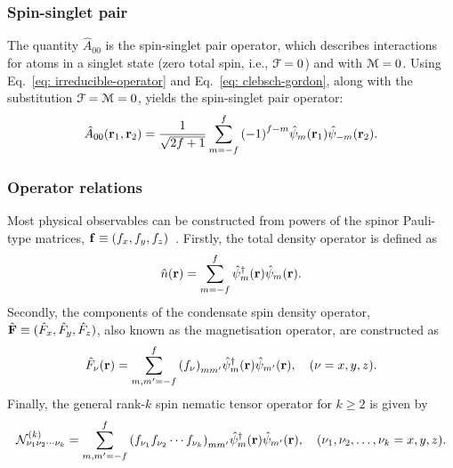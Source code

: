 \subsubsection{Spin-singlet pair}
The quantity \(\hat{A}_{00}\) is the spin-singlet pair operator, which describes
interactions for atoms in a singlet state (zero total spin, i.e.,
\(\EuScript{F} = 0\)) and with \(\EuScript{M} = 0\).
Using Eq.~\eqref{eq: irreducible-operator} and Eq.~\eqref{eq: clebsch-gordon},
along with the substitution \(\EuScript{F} = \EuScript{M} = 0\), yields the
spin-singlet pair operator:
\begin{align}
    \hat{A}_{00}(\vb{r}_1, \vb{r}_2) = \frac{1}{\sqrt{2f+1}}\sum_{m=-f}^{f}
    {(-1)}^{f-m}\hat{\psi}_m(\vb{r}_1)\hat{\psi}_{-m}(\vb{r}_2).
\end{align}

\subsubsection{Operator relations}
Most physical observables can be constructed from powers of the spinor
Pauli-type matrices, \(\vb{f} \equiv (f_x, f_y, f_z)\)~\cite{Kawaguchi2012}.
Firstly, the total density operator is defined as
\begin{align}
    \hat{n}(\vb{r}) = \sum_{m=-f}^{f}\hat{\psi}^\dagger_m(\vb{r})
    \hat{\psi}_m(\vb{r}).
\end{align}
Secondly, the components of the condensate spin density operator, \(\hat{\vb{F}}
\equiv (\hat{F}_x, \hat{F}_y, \hat{F}_z)\), also known as the magnetisation
operator, are constructed as
\begin{align}
    \hat{F}_\nu(\vb{r}) = \sum_{m,m'=-f}^{f}{\left(f_\nu\right)}_{mm'}
    \hat{\psi}^\dagger_m(\vb{r})\hat{\psi}_{m'}(\vb{r}), \quad
    (\nu = x, y, z).
\end{align}
Finally, the general rank-\(k\) spin nematic tensor operator for \(k \geq 2\) is
given by
\begin{align}
    \mathcal{N}^{(k)}_{\nu_1\nu_2\cdots\nu_k} = \sum_{m,m'=-f}^{f}
    {\left(f_{\nu_1}f_{\nu_2}\cdots f_{\nu_k}\right)}_{mm'}
    \hat{\psi}^\dagger_m(\vb{r})\hat{\psi}_{m'}(\vb{r}), \quad
    (\nu_1, \nu_2, \ldots, \nu_k = x, y, z).
\end{align}

